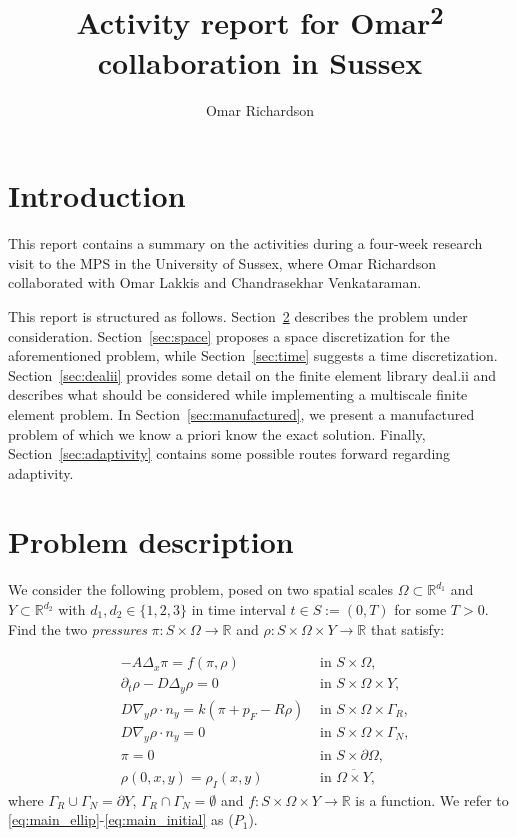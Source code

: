\documentclass{article}
\title{Activity report for Omar\textsuperscript{2} collaboration in Sussex}
\author{Omar Richardson}
\newcommand{\R}{\mathbb{ R}}
\begin{document}
\maketitle

\section{Introduction}
This report contains a summary on the activities during a four-week research visit to the MPS in the University of Sussex, where Omar Richardson collaborated with Omar Lakkis and Chandrasekhar Venkataraman.

This report is structured as follows. Section~\ref{sec:problem} describes the problem under consideration. Section~\ref{sec:space} proposes a space discretization for the aforementioned problem, while Section~\ref{sec:time} suggests a time discretization. Section~\ref{sec:dealii} provides some detail on the finite element library deal.ii and describes what should be considered while implementing a multiscale finite element problem. In Section~\ref{sec:manufactured}, we present a manufactured problem of which we know a priori know the exact solution.
Finally, Section~\ref{sec:adaptivity} contains some possible routes forward regarding adaptivity.

\section{Problem description}
\label{sec:problem}

We consider the following problem, posed on two spatial scales $\Omega\subset \R^{d_1}$ and $Y \subset \R^{d_2}$ with $d_1,d_2 \in \{1,2,3\}$ in time interval $t\in S := (0,T)$ for some $T>0$. Find the two \emph{pressures} $\pi: S\times\Omega \to \R $ and $\rho: S\times\Omega\times Y\to \R$ that satisfy:

\begin{align}
    \label{eq:main_ellip}&-A\Delta_x\pi=f(\pi,\rho)  &\mbox{ in }S\times\Omega,\\
    \label{eq:main_para}&\partial_t\rho-D\Delta_y\rho = 0  &\mbox{ in }S\times\Omega\times Y,\\
    \label{eq:main_robin}&D\nabla_y\rho\cdot n_y= k(\pi+p_F-R\rho)&\mbox{ in } S\times\Omega\times\Gamma_R,\\
    \label{eq:main_neumann}&D\nabla_y\rho\cdot n_y=0&\mbox{ in }S\times\Omega\times\Gamma_N,\\
    \label{eq:main_dirichlet}&\pi=0 &\mbox{ in }S\times\partial\Omega,\\
    \label{eq:main_initial}&\rho(0,x,y)=\rho_I(x,y)&\mbox{ in } \overline{\Omega\times Y},
\end{align}
where $\Gamma_R \cup \Gamma_N = \partial Y$, $\Gamma_R \cap \Gamma_N = \emptyset$ and $f:S\times\Omega\times Y \to \R$ is a function. We refer to \eqref{eq:main_ellip}-\eqref{eq:main_initial} as ($P_1$).
\end{document}
